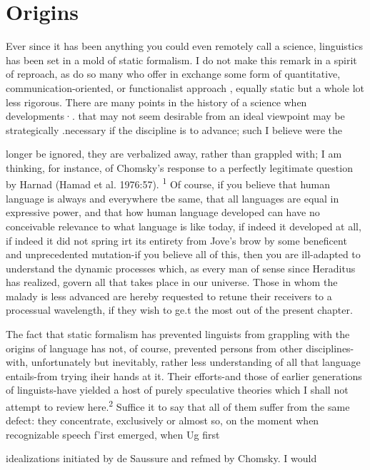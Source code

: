  \chapter{Origins} \label{ch:4}

Ever since it has been anything you could even remotely call a science, linguistics has been set in a mold of static formalism. I do not make this remark in a spirit of reproach, as do so many who offer in exchange some form of quantitative, communication-oriented, or functionalist approach , equally static but a whole lot less rigorous. There are many points in the history of a science when developments·. that may not seem desirable from an ideal viewpoint may be strategi\-cally .necessary if the discipline is to advance; such I believe were the

longer be ignored, they are verbalized away, rather than grappled with; I am thinking, for instance, of Chomsky's response to a perfectly legitimate question by Harnad (Hamad et al. 1976:57). \textsuperscript{1} Of course, if you believe that human language is always and everywhere tbe same, that all languages are equal in expressive power, and that how human language developed can have no conceivable relevance to what language is like today, if indeed it developed at all, if indeed it did not spring irt its entirety from Jove's brow by some beneficent and unprecedented mutation-if you believe all of this, then you are ill-adapted to under\-stand the dynamic processes which, as every man of sense since Hera\-ditus has realized, govern all that takes place in our universe. Those in whom the malady is less advanced are hereby requested to retune their receivers to a processual wavelength, if they wish to ge.t the most out of the present chapter.

The fact that static formalism has prevented linguists from grappling with the origins of language has not, of course, prevented persons from other disciplines-with, unfortunately but inevitably, rather less understanding of all that language entails-from trying iheir hands at it. Their efforts-and those of earlier generations of linguists-have yielded a host of purely speculative theories which I shall not attempt to review here.\textsuperscript{2} Suffice it to say that all of them suffer from the same defect: they concentrate, exclusively or almost so, on the moment when recognizable speech f'irst emerged, when Ug first

idealizations initiated by de Saussure and refmed by Chomsky. I would

